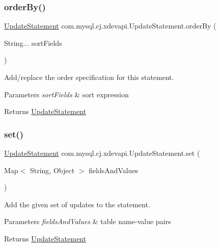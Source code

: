 \subsubsection{\texorpdfstring{order\+By()}{orderBy()}}
{\footnotesize\ttfamily \mbox{\hyperlink{interfacecom_1_1mysql_1_1cj_1_1xdevapi_1_1_update_statement}{Update\+Statement}} com.\+mysql.\+cj.\+xdevapi.\+Update\+Statement.\+order\+By (\begin{DoxyParamCaption}\item[{String...}]{sort\+Fields }\end{DoxyParamCaption})}

Add/replace the order specification for this statement.


\begin{DoxyParams}{Parameters}
{\em sort\+Fields} & sort expression \\
\hline
\end{DoxyParams}
\begin{DoxyReturn}{Returns}
\mbox{\hyperlink{interfacecom_1_1mysql_1_1cj_1_1xdevapi_1_1_update_statement}{Update\+Statement}} 
\end{DoxyReturn}
\mbox{\label{interfacecom_1_1mysql_1_1cj_1_1xdevapi_1_1_update_statement_a55ee82b73b4faf50fa2ba7dbbd723819}} 
\subsubsection{\texorpdfstring{set()}{set()}\hspace{0.1cm}{\footnotesize\ttfamily [1/2]}}
{\footnotesize\ttfamily \mbox{\hyperlink{interfacecom_1_1mysql_1_1cj_1_1xdevapi_1_1_update_statement}{Update\+Statement}} com.\+mysql.\+cj.\+xdevapi.\+Update\+Statement.\+set (\begin{DoxyParamCaption}\item[{Map$<$ String, Object $>$}]{fields\+And\+Values }\end{DoxyParamCaption})}

Add the given set of updates to the statement.


\begin{DoxyParams}{Parameters}
{\em fields\+And\+Values} & table name-\/value pairs \\
\hline
\end{DoxyParams}
\begin{DoxyReturn}{Returns}
\mbox{\hyperlink{interfacecom_1_1mysql_1_1cj_1_1xdevapi_1_1_update_statement}{Update\+Statement}} 
\end{DoxyReturn}


